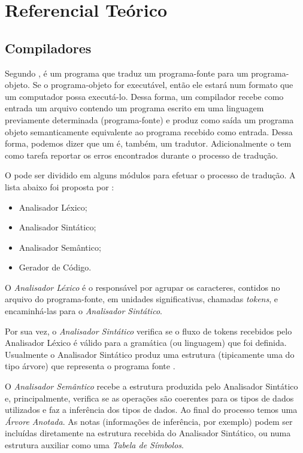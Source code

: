 \section{Referencial Teórico}
\subsection{Compiladores}
Segundo , \compilador é um programa que traduz um
programa-fonte para um programa-objeto. Se o programa-objeto for executável,
então ele estará num formato que um computador possa executá-lo. Dessa forma, um compilador recebe
como entrada um arquivo contendo um programa escrito em uma linguagem previamente
determinada (programa-fonte) e produz como saída um programa objeto semanticamente equivalente
ao programa recebido como entrada. Dessa forma, podemos dizer que um \compilador é,
também, um tradutor. Adicionalmente o \compilador tem como tarefa reportar os
erros encontrados durante o processo de tradução.

O \compilador pode ser dividido em alguns módulos para efetuar o processo de
tradução. A lista abaixo foi proposta por :

\begin{itemize}
	\item Analisador Léxico;
	\item Analisador Sintático;
	\item Analisador Semântico;
	\item Gerador de Código.
\end{itemize}

O \emph{Analisador Léxico} é o responsável por agrupar os caracteres, contidos
no arquivo do programa-fonte, em unidades significativas, chamadas
\emph{tokens}, e encaminhá-las para o \emph{Analisador Sintático}.

Por sua vez, o \emph{Analisador Sintático} verifica se o fluxo de tokens
recebidos pelo Analisador Léxico é válido para a gramática (ou linguagem) que
foi definida. Usualmente o Analisador Sintático produz uma estrutura
(tipicamente uma do tipo árvore) que representa o programa fonte
\cite{new-dragon-pt}.

O \emph{Analisador Semântico} recebe a estrutura produzida pelo Analisador
Sintático e, principalmente, verifica se as operações são coerentes para os
tipos de dados utilizados e faz a inferência dos tipos de dados. Ao final do
processo temos uma \emph{Árvore Anotada}. As notas (informações de inferência,
por exemplo) podem ser incluídas diretamente na estrutura recebida do
Analisador Sintático, ou numa estrutura auxiliar como uma \emph{Tabela de
Símbolos}.


